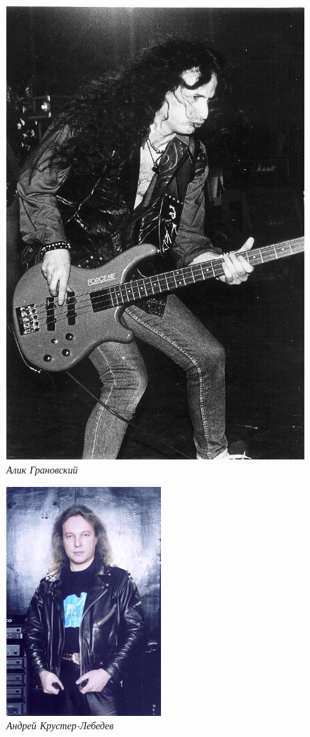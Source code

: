 \documentclass[16pt,a5paper,oneside]{book}
\begin{document}
\begin{figure}
    \centering
    \includegraphics[scale=0.9]{Image31}
    \caption{\textit{Алик Грановский}}
\end{figure}

\begin{figure}
    \centering
    \includegraphics[scale=0.9]{Image32}
    \caption{\textit{Андрей Крустер-Лебедев}}
\end{figure}
\end{document}
